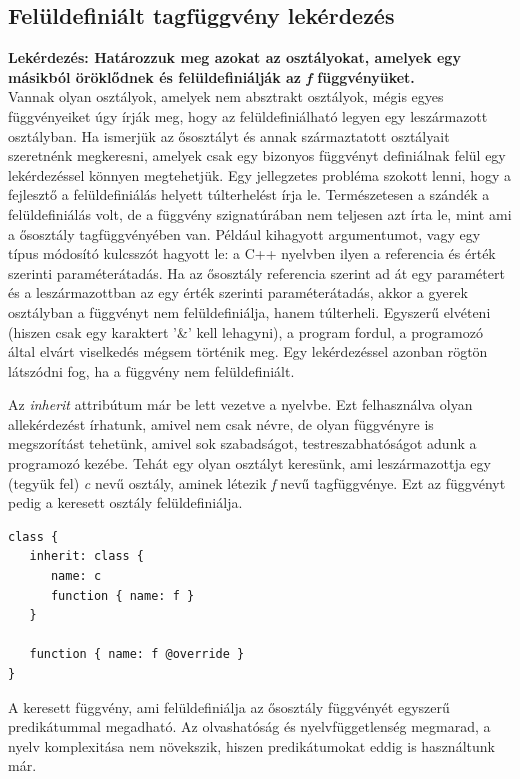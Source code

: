 \documentclass[a4paper,12pt]{report}
\begin{document}
\subsection{Felüldefiniált tagfüggvény lekérdezés}
\textbf{Lekérdezés: Határozzuk meg azokat az osztályokat, amelyek egy másikból öröklődnek és felüldefiniálják az \textit{f} függvényüket.}
\\
Vannak olyan osztályok, amelyek nem absztrakt osztályok, mégis egyes függvényeiket úgy írják meg, hogy az felüldefiniálható legyen egy leszármazott osztályban. Ha ismerjük az ősosztályt és annak származtatott osztályait szeretnénk megkeresni, amelyek csak egy bizonyos függvényt definiálnak felül egy lekérdezéssel könnyen megtehetjük. Egy jellegzetes probléma szokott lenni, hogy a fejlesztő a felüldefiniálás helyett túlterhelést írja le. Természetesen a szándék a felüldefiniálás volt, de a függvény szignatúrában nem teljesen azt írta le, mint ami a ősosztály tagfüggvényében van. Például kihagyott argumentumot, vagy egy típus módosító kulcsszót hagyott le: a C++ nyelvben ilyen a referencia és érték szerinti paraméterátadás. Ha az ősosztály referencia szerint ad át egy paramétert és a leszármazottban az egy érték szerinti paraméterátadás, akkor a gyerek osztályban a függvényt nem felüldefiniálja, hanem túlterheli. Egyszerű elvéteni (hiszen csak egy karaktert '\&' kell lehagyni), a program fordul, a programozó által elvárt viselkedés mégsem történik meg. Egy lekérdezéssel azonban rögtön látszódni fog, ha a függvény nem felüldefiniált.
\par Az \textit{inherit} attribútum már be lett vezetve a nyelvbe. Ezt felhasználva olyan allekérdezést írhatunk, amivel nem csak névre, de olyan függvényre is megszorítást tehetünk, amivel sok szabadságot, testreszabhatóságot adunk a programozó kezébe. Tehát egy olyan osztályt keresünk, ami leszármazottja egy (tegyük fel) \textit{c} nevű osztály, aminek létezik \textit{f} nevű tagfüggvénye. Ezt az függvényt pedig a keresett osztály felüldefiniálja.
\begin{verbatim}
class {
   inherit: class { 
      name: c 	
      function { name: f } 
   }
   
   function { name: f @override }
}
\end{verbatim}
A keresett függvény, ami felüldefiniálja az ősosztály függvényét egyszerű predikátummal megadható. Az olvashatóság és nyelvfüggetlenség megmarad, a nyelv komplexitása nem növekszik, hiszen predikátumokat eddig is használtunk már.
\end{document}

